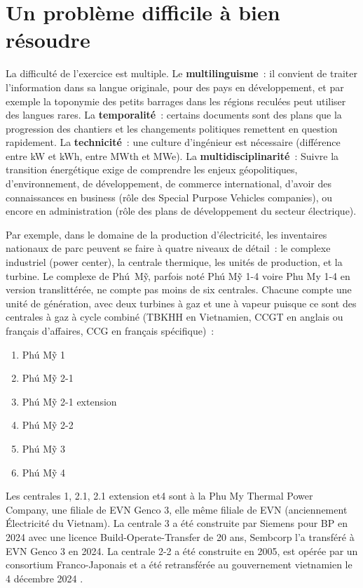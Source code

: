 \documentclass[a4paper,11pt]{report}
\begin{document}
\section{Un problème difficile à bien résoudre}

La difficulté de l'exercice est multiple. Le \textbf{multilinguisme}~: il convient de traiter l'information dans sa langue originale, pour des pays en développement, et par exemple la toponymie des petits barrages dans les régions reculées peut utiliser des langues rares. La \textbf{temporalité}~: certains documents sont des plans que la progression des chantiers et les changements politiques remettent en question rapidement. La \textbf{technicité}~: une culture d'ingénieur est nécessaire (différence entre kW et kWh, entre MWth et MWe). La \textbf{multidisciplinarité}~: Suivre la transition énergétique exige de comprendre les enjeux géopolitiques, d'environnement, de développement, de commerce international, d'avoir des connaissances en business (rôle des Special Purpose Vehicles companies), ou encore en administration (rôle des plans de développement du secteur électrique).

Par exemple, dans le domaine de la production d'électricité, les inventaires nationaux de parc peuvent se faire à quatre niveaux de détail~: le complexe industriel (power center), la centrale thermique, les unités de production, et la turbine. Le complexe de Phú~Mỹ, parfois noté Phú Mỹ 1-4 voire Phu My 1-4 en version translittérée, ne compte pas moins de six centrales. Chacune compte une unité de génération, avec deux turbines à gaz et une à vapeur puisque ce sont des centrales à gaz à cycle combiné (TBKHH en Vietnamien, CCGT en anglais ou français d'affaires, CCG en français spécifique)~:

\begin{enumerate}
\item Phú Mỹ 1
\item Phú Mỹ 2-1
\item Phú Mỹ 2-1 extension
\item Phú Mỹ 2-2
\item Phú Mỹ 3
\item Phú Mỹ 4
\end{enumerate}

Les centrales 1, 2.1, 2.1 extension et4 sont à la Phu My Thermal Power Company, une filiale de EVN Genco 3, elle même filiale de EVN (anciennement Électricité du Vietnam). La centrale 3 a été construite par Siemens pour BP en 2024 avec une licence Build-Operate-Transfer de 20 ans, Sembcorp l'a transféré à EVN Genco 3 en 2024. La centrale 2-2 a été construite en 2005, est opérée par un consortium Franco-Japonais et a été retransférée au gouvernement vietnamien le 4 décembre 2024 \citep{UAWJD84R}.
\end{document}
